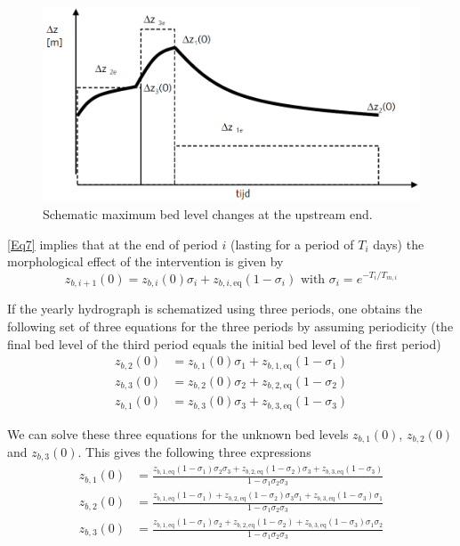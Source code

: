 \begin{figure}
\includegraphics[width=\columnwidth]{figures/Fig5.png}
\caption{Schematic maximum bed level changes at the upstream end.}
\label{App.Fig5}
\end{figure}

\autoref{Eq7} implies that at the end of period $i$ (lasting for a period of $T_i$ days) the morphological effect of the intervention is given by
%
\begin{equation}
z_{b,i+1}(0) = z_{b,i} (0) \sigma_i + z_{b,i,\text{eq}} (1-\sigma_i) \text{ with } \sigma_i = e^{-T_i/T_{m,i}}
\label{Eq8a}
\end{equation}

If the yearly hydrograph is schematized using three periods, one obtains the following set of three equations for the three periods by assuming periodicity (the final bed level of the third period equals the initial bed level of the first period)
%
\begin{align}
z_{b,2}(0) &= z_{b,1}(0) \sigma_1 + z_{b,1,\text{eq}} (1-\sigma_1) \label{Eq8b} \\
z_{b,3}(0) &= z_{b,2}(0) \sigma_2 + z_{b,2,\text{eq}} (1-\sigma_2) \label{Eq8c} \\
z_{b,1}(0) &= z_{b,3}(0) \sigma_3 + z_{b,3,\text{eq}} (1-\sigma_3) \label{Eq8d}
\end{align}

We can solve these three equations for the unknown bed levels $z_{b,1}(0)$, $z_{b,2}(0)$ and $z_{b,3}(0)$.
This gives the following three expressions
%
\begin{align}
z_{b,1}(0) &= \frac{z_{b,1,\text{eq}} (1-\sigma_1) \sigma_2 \sigma_3 + z_{b,2,\text{eq}} (1-\sigma_2) \sigma_3 + z_{b,3,\text{eq}} (1-\sigma_3)}{1 - \sigma_1 \sigma_2 \sigma_3} \label{Eq8e} \\
z_{b,2}(0) &= \frac{z_{b,1,\text{eq}} (1-\sigma_1) + z_{b,2,\text{eq}} (1-\sigma_2) \sigma_3 \sigma_1 + z_{b,3,\text{eq}} (1-\sigma_3) \sigma_1}{1 - \sigma_1 \sigma_2 \sigma_3} \label{Eq8f} \\
z_{b,3}(0) &= \frac{z_{b,1,\text{eq}} (1-\sigma_1) \sigma_2 + z_{b,2,\text{eq}} (1-\sigma_2) + z_{b,3,\text{eq}} (1-\sigma_3) \sigma_1 \sigma_2}{1 - \sigma_1 \sigma_2 \sigma_3} \label{Eq8g}
\end{align}

